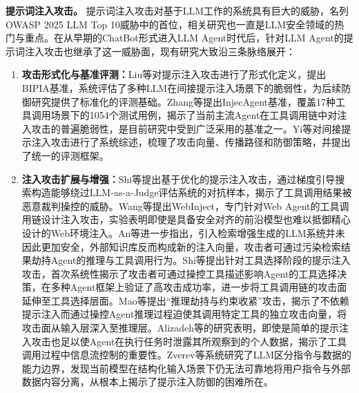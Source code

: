 \textbf{提示词注入攻击。}
提示词注入攻击对基于LLM工作的系统具有巨大的威胁，名列OWASP 2025 LLM Top 10威胁中的首位\cite{owasp2025llmtop10}，相关研究也一直是LLM安全领域的热门与重点。在从早期的ChatBot形式进入LLM Agent时代后，针对LLM Agent的提示词注入攻击也继承了这一威胁面，现有研究大致沿三条脉络展开：
\begin{enumerate}
  \item \textbf{攻击形式化与基准评测：}Liu等\cite{liu2024formalizing}对提示注入攻击进行了形式化定义，提出BIPIA基准，系统评估了多种LLM在间接提示注入场景下的脆弱性，为后续防御研究提供了标准化的评测基础。Zhang等\cite{zhang2024injectagent}提出InjecAgent基准，覆盖17种工具调用场景下的1054个测试用例，揭示了当前主流Agent在工具调用链中对注入攻击的普遍脆弱性，是目前研究中受到广泛采用的基准之一\cite{balunovic2024agentdojo,zhan2025adaptive,an2025ipiguard}。Yi等\cite{yi2024survey}对间接提示注入攻击进行了系统综述，梳理了攻击向量、传播路径和防御策略，并提出了统一的评测框架。
  \item \textbf{注入攻击扩展与增强：}Shi等\cite{shi2024optimization}提出基于优化的提示注入攻击，通过梯度引导搜索构造能够绕过LLM-as-a-Judge评估系统的对抗样本，揭示了工具调用结果被恶意裁判操控的威胁。Wang等\cite{wang2025webinject}提出WebInject，专门针对Web Agent的工具调用链设计注入攻击，实验表明即使是具备安全对齐的前沿模型也难以抵御精心设计的Web环境注入。An等\cite{an2025rag}进一步指出，引入检索增强生成的LLM系统并未因此更加安全，外部知识库反而构成新的注入向量，攻击者可通过污染检索结果劫持Agent的推理与工具调用行为。Shi等\cite{shi2026pitoolselection}提出针对工具选择阶段的提示注入攻击，首次系统性揭示了攻击者可通过操控工具描述影响Agent的工具选择决策，在多种Agent框架上验证了高攻击成功率，进一步将工具调用链的攻击面延伸至工具选择层面。Mao等\cite{mao2026stopfixating}提出“推理劫持与约束收紧”攻击，揭示了不依赖提示注入而通过操控Agent推理过程迫使其调用特定工具的独立攻击向量，将攻击面从输入层深入至推理层。Alizadeh等\cite{alizadeh2025simpleleakdata}的研究表明，即使是简单的提示注入攻击也足以使Agent在执行任务时泄露其所观察到的个人数据，揭示了工具调用过程中信息流控制的重要性。Zverev等\cite{zverev2025can}系统研究了LLM区分指令与数据的能力边界，发现当前模型在结构化输入场景下仍无法可靠地将用户指令与外部数据内容分离，从根本上揭示了提示注入防御的困难所在。

\end{enumerate}
